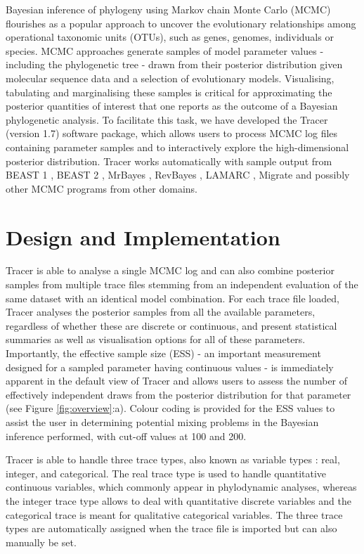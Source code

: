 \documentclass{bioinfo}
\begin{document}
Bayesian inference of phylogeny using Markov chain Monte Carlo (MCMC) \citep{rannala1996probability, mau1999bayesian} flourishes as a popular approach to uncover the evolutionary relationships among operational taxonomic units (OTUs), such as genes, genomes, individuals or species.
MCMC approaches generate samples of model parameter values - including the phylogenetic tree - drawn from their posterior distribution given molecular sequence data and a selection of evolutionary models.
Visualising, tabulating and marginalising these samples is critical for approximating the posterior quantities of interest that one reports as the outcome of a Bayesian phylogenetic analysis.
To facilitate this task, we have developed the Tracer (version 1.7) software package, which allows users to process MCMC log files containing parameter samples and to interactively explore the high-dimensional posterior distribution.
Tracer works automatically with sample output from BEAST 1 \citep{drummond2012bayesian}, BEAST 2 \citep{bouckaert2014beast2}, MrBayes \citep{ronquist2012mrbayes}, RevBayes \citep{hohna2016revbayes}, LAMARC \citep{kuhner2006lamarc}, Migrate \citep{beerli2006comparison} and possibly other MCMC programs from other domains.



\section*{Design and Implementation}

Tracer is able to analyse a single MCMC log and can also combine posterior samples from multiple trace files stemming from an independent evaluation of the same dataset with an identical model combination.
For each trace file loaded, Tracer analyses the posterior samples from all the available parameters, regardless of whether these are discrete or continuous, and present statistical summaries as well as visualisation options for all of these parameters.
Importantly, the effective sample size (ESS) - an important measurement designed for a sampled parameter having continuous values - is immediately apparent in the default view of Tracer and allows users to assess the number of effectively independent draws from the posterior distribution for that parameter (see Figure \ref{fig:overview}:a).
Colour coding is provided for the ESS values to assist the user in determining potential mixing problems in the Bayesian inference performed, with cut-off values at 100 and 200.

Tracer is able to handle three trace types, also known as variable types \citep{mendenhall2012introduction}: real, integer, and categorical.
The real trace type is used to handle quantitative continuous variables, which commonly appear in phylodynamic analyses, whereas the integer trace type allows to deal with quantitative discrete variables and the categorical trace is meant for qualitative categorical variables.
The three trace types are automatically assigned when the trace file is imported but can also manually be set.
\end{document}
